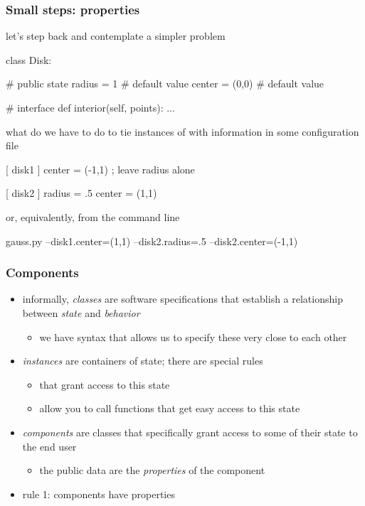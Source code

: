 \begin{frame}[fragile]
%
  \frametitle{Small steps: properties}
%
  let's step back and contemplate a simpler problem
%
  \begin{ipython}{}
class Disk:

    # public state
    radius = 1     # default value
    center = (0,0) # default value

    # interface
    def interior(self, points):
        ...
  \end{ipython}
%
  what do we have to do to tie instances of  with information in some configuration
  file
%
  \begin{icfg}{}
    [ disk1 ]
    center = (-1,1)   ; leave {radius} alone

    [ disk2 ]
    radius = .5
    center = (1,1)
  \end{icfg}
%
  or, equivalently, from the command line
%
  \begin{ish}{}
gauss.py --disk1.center=(1,1) --disk2.radius=.5 --disk2.center=(-1,1)
  \end{ish}
%
\end{frame}

\begin{frame}[fragile]
%
  \frametitle{Components}
%
  \begin{itemize}
%
  \item informally, \emph{classes} are software specifications that establish a relationship
    between \emph{state} and \emph{behavior}
    \begin{itemize}
    \item we have syntax that allows us to specify these very close to each other
    \end{itemize}
%
  \item \emph{instances} are containers of state; there are special rules
    \begin{itemize}
    \item that grant access to this state
    \item allow you to call functions that get easy access to this state
    \end{itemize}
%
  \item \emph{components} are classes that specifically grant access to some of their state to
    the end user
    \begin{itemize}
    \item the public data are the \emph{properties} of the component
    \end{itemize}
%
  \item rule 1: components have properties
%
  \end{itemize}
%
\end{frame}

